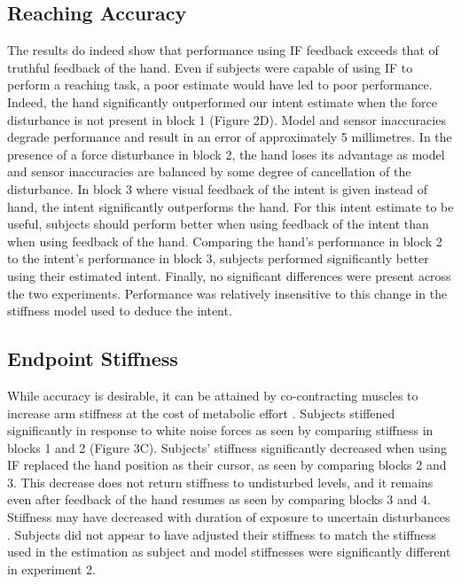 \documentclass{frontiersSCNS} %
\begin{document}
\subsection*{Reaching Accuracy}
The results do indeed show that performance using IF feedback exceeds that of truthful feedback of the hand. Even if subjects were capable of using IF to perform a reaching task, a poor estimate would have led to poor performance. Indeed, the hand significantly outperformed our intent estimate when the force disturbance is not present in block 1 (Figure 2D). Model and sensor inaccuracies degrade performance and result in an error of approximately 5 millimetres. In the presence of a force disturbance in block 2, the hand loses its advantage as model and sensor inaccuracies are balanced by some degree of cancellation of the disturbance. In block 3 where visual feedback of the intent is given instead of hand, the intent significantly outperforms the hand. For this intent estimate to be useful, subjects should perform better when using feedback of the intent than when using feedback of the hand. Comparing the hand's performance in block 2 to the intent's performance in block 3, subjects performed significantly better using their estimated intent. Finally, no significant differences were present across the two experiments. Performance was relatively insensitive to this change in the stiffness model used to deduce the intent.

\subsection*{Endpoint Stiffness}
While accuracy is desirable, it can be attained by co-contracting muscles to increase arm stiffness at the cost of metabolic effort \citep{gribble2003role, takahashi2001impedance}. Subjects stiffened significantly in response to white noise forces as seen by comparing stiffness in blocks 1 and 2 (Figure 3C). Subjects' stiffness significantly decreased when using IF replaced the hand position as their cursor, as seen by comparing blocks 2 and 3. This decrease does not return stiffness to undisturbed levels, and it remains even after feedback of the hand resumes as seen by comparing blocks 3 and 4. Stiffness may have decreased with duration of exposure to uncertain disturbances \citep{takahashi2001impedance}. Subjects did not appear to have adjusted their stiffness to match the stiffness used in the estimation as subject and model stiffnesses were significantly different in experiment 2.
\end{document}
